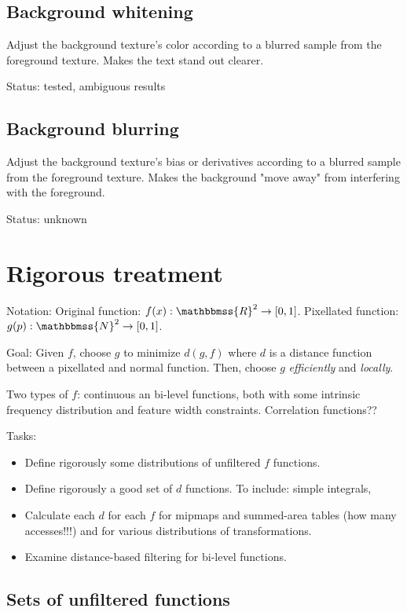 \documentclass{article}
\begin{document}
\subsection{Background whitening}

Adjust the background texture's color according
to a blurred sample from the foreground texture. Makes the text
stand out clearer.

Status: tested, ambiguous results

\subsection{Background blurring}

Adjust the background texture's bias or derivatives according
to a blurred sample from the foreground texture. Makes the background
"move away" from interfering with the foreground.

Status: unknown

\section{Rigorous treatment}

Notation: Original function: $f(x) : \mathbbmss{R}^2 \rightarrow [0,1]$.  
Pixellated function: $g(p) : \mathbbmss{N}^2 \rightarrow [0,1]$.

Goal: Given $f$, choose $g$ to minimize $d(g, f)$ where $d$ 
is a distance function between a pixellated and normal function.
Then, choose $g$ \emph{efficiently} and \emph{locally}.

Two types of $f$: continuous an bi-level functions, both with
some intrinsic frequency distribution and feature width constraints.
Correlation functions??

Tasks:
\begin{itemize}
\item Define rigorously some distributions of unfiltered $f$ functions.
\item Define rigorously a good set of $d$ functions. To include: 
    simple integrals, 
\item Calculate each $d$ for each $f$ for mipmaps and summed-area tables (how many accesses!!!) and
    for various distributions of transformations.
\item Examine distance-based filtering for bi-level functions.
\end{itemize}

\subsection{Sets of unfiltered functions}
\end{document}
